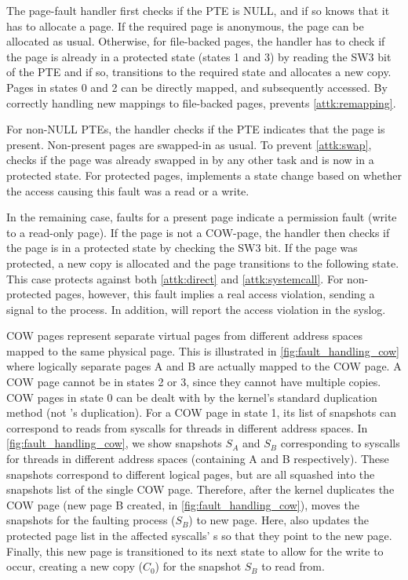 \documentclass[letterpaper,twocolumn,10pt, anonymous]{article}
\begin{document}
The page-fault handler first checks if the PTE is NULL, and if so 
knows that it has to allocate a page. 
If the required page is anonymous, the page can be allocated as usual.
Otherwise, for file-backed pages, the handler has to check if the 
page is already in a protected state (states 1 and 3) by reading 
the SW3 bit of the PTE and if so, transitions to the required state
and allocates a new copy. 
Pages in states 0 and 2 can be directly mapped, and subsequently
accessed.
By correctly handling new mappings to file-backed pages, \tiktok
prevents \autoref{attk:remapping}. 

For non-NULL PTEs, the handler checks if the PTE indicates that the 
page is present.
Non-present pages are swapped-in as usual.
To prevent \autoref{attk:swap}, \tiktok checks if the page was already
swapped in by any other task and is now in a protected state.
For protected pages, \tiktok implements a state change based on 
whether the access causing this fault was a read or a write.

In the remaining case, faults for a present page indicate a 
permission fault (write to a read-only page).
If the page is not a COW-page, the handler then checks if the page
is in a protected state by checking the SW3 bit.
If the page was protected, a new copy is allocated and the page 
transitions to the following state.
This case protects against both \autoref{attk:direct} and 
\autoref{attk:systemcall}.
For non-protected pages, however, this fault implies a real access
violation, sending a signal to the process.
In addition, \tiktok will report the access violation in the syslog.

COW pages represent separate virtual pages from different 
address spaces mapped to the same physical page.
This is illustrated in \autoref{fig:fault_handling_cow} where 
logically separate pages A and B are actually mapped to the COW
page.
A COW page cannot be in states 2 or 3, since they cannot have multiple
\tiktok copies.
COW pages in state 0 can be dealt with by the kernel's standard
duplication method (not \tiktok's duplication).
For a COW page in state 1, its list of snapshots can correspond to 
reads from syscalls for threads in different address spaces.
In \autoref{fig:fault_handling_cow}, we show snapshots $S_A$ and 
$S_B$ corresponding to syscalls for threads in different address 
spaces (containing A and B respectively).
These snapshots correspond to different logical pages, but are 
all squashed into the snapshots list of the single COW page. 
Therefore, after the kernel duplicates the COW page (new page
B created, in \autoref{fig:fault_handling_cow}), \tiktok moves 
the snapshots for the faulting process ($S_B$) to new page.
Here, \tiktok also updates the protected page list in the 
affected syscalls' s so that they point to the 
new page.
Finally, this new page is transitioned to its next state to allow 
for the write to occur, creating a new copy ($C_0$) for the
snapshot $S_B$ to read from.
\end{document}
